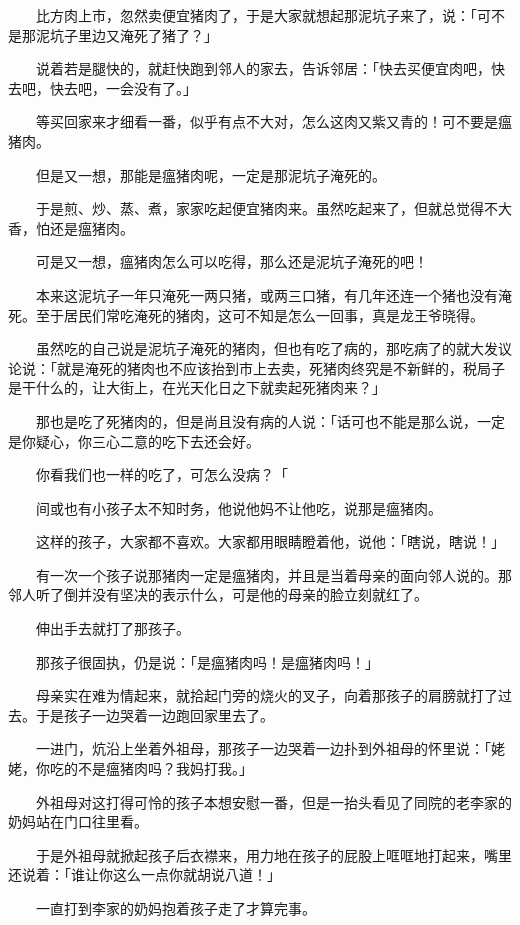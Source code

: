 \documentclass[UTF8]{ctexart}
\begin{document}
　　比方肉上市，忽然卖便宜猪肉了，于是大家就想起那泥坑子来了，说：「可不是那泥坑子里边又淹死了猪了？」

　　说着若是腿快的，就赶快跑到邻人的家去，告诉邻居：「快去买便宜肉吧，快去吧，快去吧，一会没有了。」

　　等买回家来才细看一番，似乎有点不大对，怎么这肉又紫又青的！可不要是瘟猪肉。

　　但是又一想，那能是瘟猪肉呢，一定是那泥坑子淹死的。

　　于是煎、炒、蒸、煮，家家吃起便宜猪肉来。虽然吃起来了，但就总觉得不大香，怕还是瘟猪肉。

　　可是又一想，瘟猪肉怎么可以吃得，那么还是泥坑子淹死的吧！

　　本来这泥坑子一年只淹死一两只猪，或两三口猪，有几年还连一个猪也没有淹死。至于居民们常吃淹死的猪肉，这可不知是怎么一回事，真是龙王爷晓得。

　　虽然吃的自己说是泥坑子淹死的猪肉，但也有吃了病的，那吃病了的就大发议论说：「就是淹死的猪肉也不应该抬到市上去卖，死猪肉终究是不新鲜的，税局子是干什么的，让大街上，在光天化日之下就卖起死猪肉来？」

　　那也是吃了死猪肉的，但是尚且没有病的人说：「话可也不能是那么说，一定是你疑心，你三心二意的吃下去还会好。

　　你看我们也一样的吃了，可怎么没病？「

　　间或也有小孩子太不知时务，他说他妈不让他吃，说那是瘟猪肉。

　　这样的孩子，大家都不喜欢。大家都用眼睛瞪着他，说他：「瞎说，瞎说！」

　　有一次一个孩子说那猪肉一定是瘟猪肉，并且是当着母亲的面向邻人说的。那邻人听了倒并没有坚决的表示什么，可是他的母亲的脸立刻就红了。

　　伸出手去就打了那孩子。

　　那孩子很固执，仍是说：「是瘟猪肉吗！是瘟猪肉吗！」

　　母亲实在难为情起来，就拾起门旁的烧火的叉子，向着那孩子的肩膀就打了过去。于是孩子一边哭着一边跑回家里去了。

　　一进门，炕沿上坐着外祖母，那孩子一边哭着一边扑到外祖母的怀里说：「姥姥，你吃的不是瘟猪肉吗？我妈打我。」

　　外祖母对这打得可怜的孩子本想安慰一番，但是一抬头看见了同院的老李家的奶妈站在门口往里看。

　　于是外祖母就掀起孩子后衣襟来，用力地在孩子的屁股上哐哐地打起来，嘴里还说着：「谁让你这么一点你就胡说八道！」

　　一直打到李家的奶妈抱着孩子走了才算完事。
\end{document}

